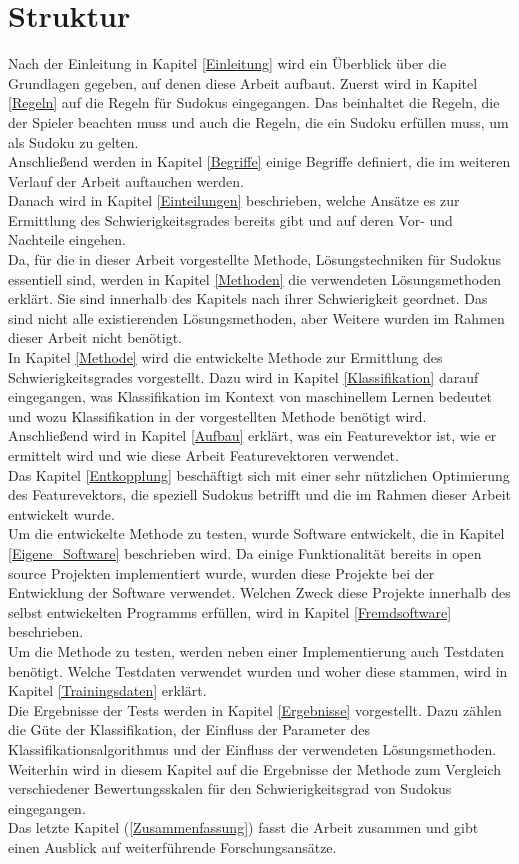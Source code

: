 \newpage
\section{Struktur}
Nach der Einleitung in Kapitel \ref{Einleitung} wird ein Überblick über die Grundlagen gegeben, auf denen diese Arbeit aufbaut. Zuerst wird in Kapitel \ref{Regeln} auf die Regeln für Sudokus eingegangen. Das beinhaltet die Regeln, die der Spieler beachten muss und auch die Regeln, die ein Sudoku erfüllen muss, um als Sudoku zu gelten. \\
Anschließend werden in Kapitel \ref{Begriffe} einige Begriffe definiert, die im weiteren Verlauf der Arbeit auftauchen werden.\\
Danach wird in Kapitel \ref{Einteilungen} beschrieben, welche Ansätze es zur Ermittlung des Schwierigkeitsgrades bereits gibt und auf deren Vor- und Nachteile eingehen.\\
Da, für die in dieser Arbeit vorgestellte Methode, Lösungstechniken für Sudokus essentiell sind, werden in Kapitel \ref{Methoden} die verwendeten Lösungsmethoden erklärt. Sie sind innerhalb des Kapitels nach ihrer Schwierigkeit geordnet. Das sind nicht alle existierenden Lösungsmethoden, aber Weitere wurden im Rahmen dieser Arbeit nicht benötigt.\\
In Kapitel \ref{Methode} wird die entwickelte Methode zur Ermittlung des Schwierigkeitsgrades vorgestellt. Dazu wird in Kapitel \ref{Klassifikation} darauf eingegangen, was Klassifikation im Kontext von maschinellem Lernen bedeutet und wozu Klassifikation in der vorgestellten Methode benötigt wird.\\
Anschließend wird in Kapitel \ref{Aufbau} erklärt, was ein Featurevektor ist, wie er ermittelt wird und wie diese Arbeit Featurevektoren verwendet.\\
Das Kapitel \ref{Entkopplung} beschäftigt sich mit einer sehr nützlichen Optimierung des Featurevektors, die speziell Sudokus betrifft und die im Rahmen dieser Arbeit entwickelt wurde.\\
Um die entwickelte Methode zu testen, wurde Software entwickelt, die in Kapitel \ref{Eigene_Software} beschrieben wird. Da einige Funktionalität bereits in open source Projekten implementiert wurde, wurden diese Projekte bei der Entwicklung der Software verwendet. Welchen Zweck diese Projekte innerhalb des selbst entwickelten Programms erfüllen, wird in Kapitel \ref{Fremdsoftware} beschrieben.\\
Um die Methode zu testen, werden neben einer Implementierung auch Testdaten benötigt. Welche Testdaten verwendet wurden und woher diese stammen, wird in Kapitel \ref{Trainingsdaten} erklärt.\\
Die Ergebnisse der Tests werden in Kapitel \ref{Ergebnisse} vorgestellt. Dazu zählen die Güte der Klassifikation, der Einfluss der Parameter des Klassifikationsalgorithmus und der Einfluss der verwendeten Lösungsmethoden. Weiterhin wird in diesem Kapitel auf die Ergebnisse der Methode zum Vergleich verschiedener Bewertungsskalen für den Schwierigkeitsgrad von Sudokus eingegangen.\\
Das letzte Kapitel (\ref{Zusammenfassung}) fasst die Arbeit zusammen und gibt einen Ausblick auf weiterführende Forschungsansätze.